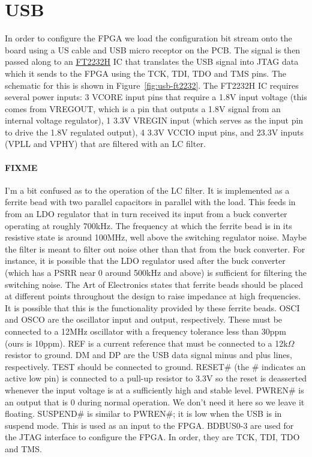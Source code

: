 \section{USB}

In order to configure the FPGA we load the configuration bit stream onto the board using a US cable
and USB micro receptor on the PCB. The signal is then passed along to
an \href{http://www.ftdichip.com/Support/Documents/DataSheets/ICs/DS_FT2232H.pdf}{FT2232H} IC
that translates the USB signal into JTAG data which it sends to the FPGA using the TCK, TDI, TDO and
TMS pins. The schematic for this is shown in Figure~\ref{fig:usb-ft2232}. The FT2232H IC
requires several power inputs: 3 VCORE input pins that require a 1.8V input voltage (this comes from
VREGOUT, which is a pin that outputs a 1.8V signal from an internal voltage regulator), 1 3.3V VREGIN
input (which serves as the input pin to drive the 1.8V regulated output), 4 3.3V VCCIO input pins,
and 23.3V inputs (VPLL and VPHY) that are filtered with an LC filter.

\paragraph{FIXME} I'm a bit confused as to the operation of the LC filter. It is implemented as a
ferrite bead with two parallel capacitors in parallel with the load. This feeds in from an LDO
regulator that in turn received its input from a buck converter operating at roughly 700kHz. The
frequency at which the ferrite bead is in its resistive state is around 100MHz, well above the
switching regulator noise. Maybe the filter is meant to filter out noise other than that from the
buck converter. For instance, it is possible that the LDO regulator used after the buck converter
(which has a PSRR near 0 around 500kHz and above) is sufficient for filtering the switching
noise. The Art of Electronics states that ferrite beads should be placed at different points
throughout the design to raise impedance at high frequencies. It is possible that this is the
functionality provided by these ferrite beads.  OSCI and OSCO are the oscillator input and output,
respectively. These must be connected to a 12MHz oscillator with a frequency tolerance less than
30ppm (ours is 10ppm). REF is a current reference that must be connected to a 12k$\Omega$ resistor to
ground. DM and DP are the USB data signal minus and plus lines, respectively. TEST should be
connected to ground. RESET\# (the \# indicates an active low pin) is connected to a pull-up resistor
to 3.3V so the reset is deasserted whenever the input voltage is at a sufficiently high and stable
level. PWREN\# is an output that is 0 during normal operation. We don't need it here so we leave it
floating. SUSPEND\# is similar to PWREN\#; it is low when the USB is in suspend mode. This is used as
an input to the FPGA. BDBUS0-3 are used for the JTAG interface to configure the FPGA. In order, they
are TCK, TDI, TDO and TMS.

